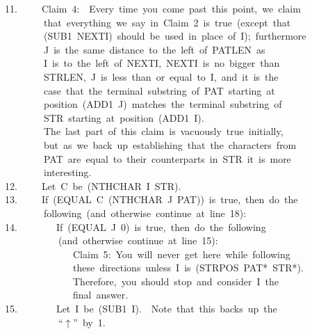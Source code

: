 \documentclass[11pt]{book}
\newenvironment{pubasis}{\begin{flushleft}\ttfamily\small}{\normalsize\rmfamily\end{flushleft}}
\begin{document}
\begin{pubasis}
11.~~~~~Claim~4:~~Every~time~you~come~past~this~point,~we~claim\\
~~~~~~~~that~everything~we~say~in~Claim~2~is~true~(except~that\\
~~~~~~~~(SUB1~NEXTI)~should~be~used~in~place~of~I);~furthermore\\
~~~~~~~~J~is~the~same~distance~to~the~left~of~PATLEN~as\\
~~~~~~~~I~is~to~the~left~of~NEXTI,~NEXTI~is~no~bigger~than\\
~~~~~~~~STRLEN,~J~is~less~than~or~equal~to~I,~and~it~is~the\\
~~~~~~~~case~that~the~terminal~substring~of~PAT~starting~at\\
~~~~~~~~position~(ADD1~J)~matches~the~terminal~substring~of\\
~~~~~~~~STR~starting~at~position~(ADD1~I).\\

~~~~~~~~The~last~part~of~this~claim~is~vacuously~true~initially,\\
~~~~~~~~but~as~we~back~up~establishing~that~the~characters~from\\
~~~~~~~~PAT~are~equal~to~their~counterparts~in~STR~it~is~more\\
~~~~~~~~interesting.\\

12.~~~~~Let~C~be~(NTHCHAR~I~STR).\\

13.~~~~~If~(EQUAL~C~(NTHCHAR~J~PAT))~is~true,~then~do~the\\
~~~~~~~~following~(and~otherwise~continue~at~line~18):\\

14.~~~~~~~~If~(EQUAL~J~0)~is~true,~then~do~the~following\\
~~~~~~~~~~~(and~otherwise~continue~at~line~15):\\

~~~~~~~~~~~~~~Claim~5:~You~will~never~get~here~while~following\\
~~~~~~~~~~~~~~these~directions~unless~I~is~(STRPOS~PAT*~STR*).\\

~~~~~~~~~~~~~~Therefore,~you~should~stop~and~consider~I~the\\
~~~~~~~~~~~~~~final~answer.\\

15.~~~~~~~~Let~I~be~(SUB1~I).~~Note~that~this~backs~up~the\\
~~~~~~~~~~~``$\uparrow$''~by~1.\\


\end{pubasis}
\end{document}
